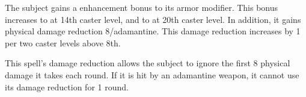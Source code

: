 \spelldur{\durshort}
\begin{spelleffect}
    The subject gains a  enhancement bonus to its armor modifier. This bonus increases to  at 14th caster level, and to  at 20th caster level. In addition, it gains physical damage reduction 8/adamantine. This damage reduction increases by 1 per two caster levels above 8th.
\end{spelleffect}
\begin{spellnotes}
  This spell's damage reduction allows the subject to ignore the first 8 physical damage it takes each round. If it is hit by an adamantine weapon, it cannot use its damage reduction for 1 round.
\end{spellnotes}

